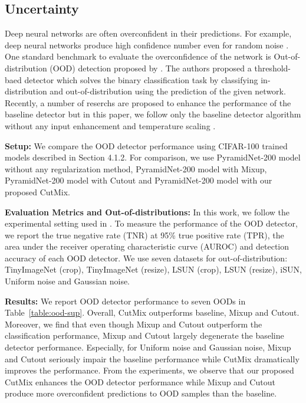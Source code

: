 

\subsection{Uncertainty}

Deep neural networks are often overconfident in their predictions. For example, deep neural networks produce high confidence number even for random noise \cite{hendrycks2016baseline}. One standard benchmark to evaluate the overconfidence of the network is Out-of-distribution (OOD) detection proposed by \cite{hendrycks2016baseline}. The authors proposed a threshold-baed detector which solves the binary classification task by classifying in-distribution and out-of-distribution using the prediction of the given network. Recently, a number of reserchs are proposed to enhance the performance of the baseline detector \cite{liang2017odin, lee2018simple} but in this paper, we follow only the baseline detector algorithm without any input enhancement and temperature scaling \cite{liang2017odin}.

\noindent\textbf{Setup: }
We compare the OOD detector performance using CIFAR-100 trained models described in Section 4.1.2. For comparison, we use PyramidNet-200 model without any regularization method, PyramidNet-200 model with Mixup, PyramidNet-200 model with Cutout and PyramidNet-200 model with our proposed CutMix.

\noindent\textbf{Evaluation Metrics and Out-of-distributions: }
In this work, we follow the experimental setting used in \cite{hendrycks2016baseline, liang2017odin}.
To measure the performance of the OOD detector, we report the true negative rate (TNR) at 95\% true positive rate (TPR), the area under the receiver operating characteristic curve (AUROC) and detection accuracy of each OOD detector.
We use seven datasets for out-of-distribution: TinyImageNet (crop), TinyImageNet (resize), LSUN \cite{yu2015lsun} (crop), LSUN (resize), iSUN, Uniform noise and Gaussian noise.

\noindent\textbf{Results: } 
We report OOD detector performance to seven OODs in Table~\ref{table:ood-sup}. Overall, CutMix outperforms baseline, Mixup and Cutout. Moreover, we find that even though Mixup and Cutout outperform the classification performance, Mixup and Cutout largely degenerate the baseline detector performance.
Especially, for Uniform noise and Gaussian noise, Mixup and Cutout seriously impair the baseline performance while CutMix dramatically improves the performance.
From the experiments, we observe that our proposed CutMix enhances the OOD detector performance while Mixup and Cutout produce more overconfident predictions to OOD samples than the baseline.